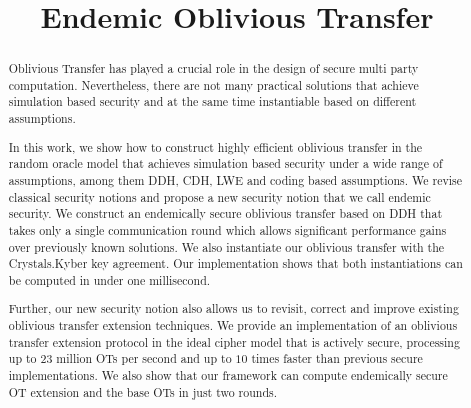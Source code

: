 \documentclass[10pt]{article}
\title{Endemic Oblivious Transfer}
\begin{document}
\maketitle

\begin{abstract}
Oblivious Transfer has played a crucial role in the design of secure multi party computation. Nevertheless, there are not many practical solutions that achieve simulation based security and at the same time instantiable based on different assumptions.

In this work, we show how to construct highly efficient oblivious transfer in the random oracle model that achieves simulation based security under a wide range of assumptions, among them DDH, CDH, LWE and coding based assumptions. We revise classical security notions and propose a new security notion that we call endemic security. We construct an endemically secure oblivious transfer based on DDH that takes only a single communication round which allows significant performance gains over previously known solutions. We also instantiate our oblivious transfer with the Crystals.Kyber key agreement. Our implementation shows that both instantiations can be computed in under one millisecond. 

Further, our new security notion also allows us to revisit, correct and improve existing oblivious transfer extension techniques. We provide an implementation of an oblivious transfer extension protocol in the ideal cipher model that is actively secure, processing up to 23 million OTs per second and up to $10$ times faster than previous secure implementations. We also show that our framework can compute endemically secure OT extension and the base OTs in just two rounds.

\end{abstract}









% 






\appendix




%



%
\end{document}
